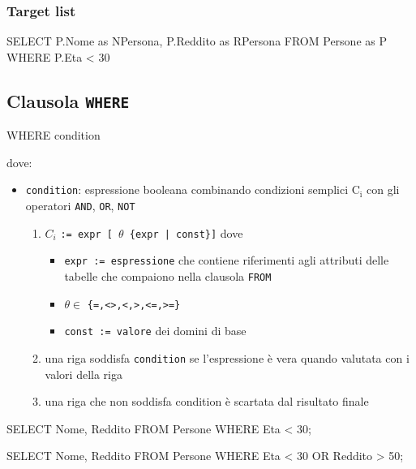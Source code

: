 \subsubsection{Target list}
\begin{codiceSQL}
SELECT P.Nome as NPersona, P.Reddito as RPersona
FROM Persone as P
WHERE P.Eta < 30
\end{codiceSQL}


\subsection{Clausola \texttt{WHERE}}
\begin{codiceSQL}
WHERE condition
\end{codiceSQL}

dove:
\begin{itemize}[label=$\triangleright$, itemsep=\smallskipamount]
  \item \texttt{condition}: espressione booleana combinando condizioni semplici $\mathrm{C_{i}}$ con gli operatori \texttt{AND}, \texttt{OR}, \texttt{NOT}
  \begin{enumerate}
    \item  $C_{i}$ \texttt{:= expr [ $\theta$ \{expr | const\}]} dove
  \begin{itemize}[label=$\circ$, itemsep=\smallskipamount]
    \item \texttt{expr := espressione} che contiene riferimenti agli attributi delle tabelle che compaiono nella clausola \texttt{FROM}
    \item $\theta \in$ \texttt{\{=,<>,<,>,<=,>=\}}
    \item \texttt{const := valore} dei domini di base
  \end{itemize}
  \item una riga soddisfa \texttt{condition} se l’espressione è vera quando valutata con i valori della riga
  \item una riga che non soddisfa condition è scartata dal risultato finale
  \end{enumerate}
\end{itemize}


\begin{minipage}[t]{0.39\textwidth}
\begin{codiceSQL}
SELECT Nome, Reddito
FROM Persone
WHERE Eta < 30;
\end{codiceSQL}
\end{minipage}
\hfill
\begin{minipage}[t]{0.39\textwidth}
\begin{codiceSQL}
SELECT Nome, Reddito
FROM Persone
WHERE Eta < 30 OR Reddito > 50;
\end{codiceSQL}
\end{minipage}



